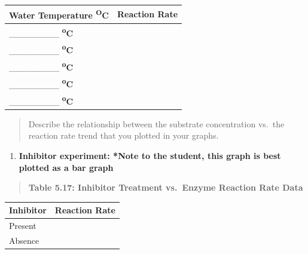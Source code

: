 \documentclass[
  letterpaper,
  DIV=11,
  numbers=noendperiod]{scrreprt}
\newcounter{none} %
\providecommand{\tightlist}{%
  \setlength{\itemsep}{0pt}\setlength{\parskip}{0pt}}
\begin{document}
{\def\LTcaptype{none} %
\begin{longtable}[]{@{}
  >{\centering\arraybackslash}p{}
  >{\raggedright\arraybackslash}p{}@{}}
\toprule\noalign{}
\begin{minipage}[b]{\linewidth}\centering
\textbf{Water Temperature \textsuperscript{O}C}
\end{minipage} & \begin{minipage}[b]{\linewidth}\raggedright
\textbf{Reaction Rate}
\end{minipage} \\
\midrule\noalign{}
\endhead
\bottomrule\noalign{}
\endlastfoot
\_\_\_\_\_\_\_\_ \textbf{\textsuperscript{o}C} & \\
\_\_\_\_\_\_\_\_ \textbf{\textsuperscript{o}C} & \\
\_\_\_\_\_\_\_\_ \textbf{\textsuperscript{o}C} & \\
\_\_\_\_\_\_\_\_ \textbf{\textsuperscript{o}C} & \\
\_\_\_\_\_\_\_\_ \textbf{\textsuperscript{o}C} & \\
\end{longtable}
}

\begin{quote}
Describe the relationship between the substrate concentration vs.~the
reaction rate trend that you plotted in your graphs.
\end{quote}

\begin{enumerate}
\def\labelenumi{\alph{enumi})}
\setcounter{enumi}{4}
\tightlist
\item
  \textbf{Inhibitor experiment: *Note to the student, this graph is best
  plotted as a bar graph}
\end{enumerate}

\begin{quote}
\textbf{Table 5.17: Inhibitor Treatment vs.~Enzyme Reaction Rate Data}
\end{quote}

{\def\LTcaptype{none} %
\begin{longtable}[]{@{}
  >{\centering\arraybackslash}p{}
  >{\raggedright\arraybackslash}p{}@{}}
\toprule\noalign{}
\begin{minipage}[b]{\linewidth}\centering
\textbf{Inhibitor}
\end{minipage} & \begin{minipage}[b]{\linewidth}\raggedright
\textbf{Reaction Rate}
\end{minipage} \\
\midrule\noalign{}
\endhead
\bottomrule\noalign{}
\endlastfoot
Present & \\
Absence & \\
\end{longtable}
}
\end{document}
